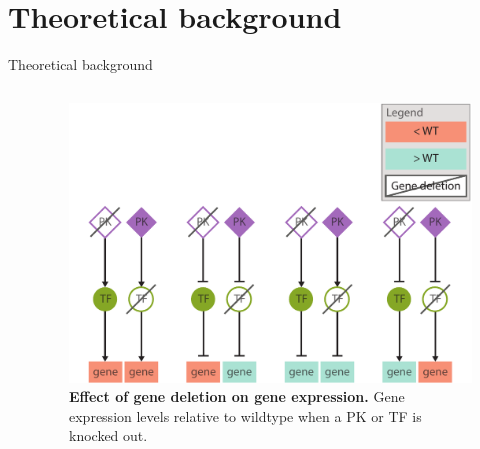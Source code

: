 \section{Theoretical background}
\begin{frame}{Theoretical background}
\begin{columns}
\begin{column}{0.5\textwidth}


\end{column}
\begin{column}{0.5\textwidth}
\begin{figure}[ht]
    \centering
    \includegraphics[width=\textwidth]{theory/fig/deletion_effects.pdf}
    \caption{\textbf{Effect of gene deletion on gene expression.} Gene expression levels relative to wildtype when a \textcolor{pk}{PK} or \textcolor{tf}{TF} is knocked out.}
    \label{fig:gene_deletion}
\end{figure}
\end{column}
\end{columns}
\end{frame}





% 



